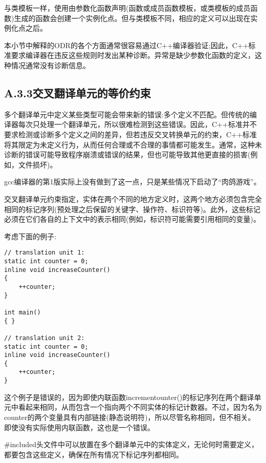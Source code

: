 与类模板一样，使用由参数化函数声明(函数或成员函数模板，或类模板的成员函数)生成的函数会创建一个实例化点。但与类模板不同，相应的定义可以出现在实例化点之后。

本小节中解释的ODR的各个方面通常很容易通过C++编译器验证;因此，C++标准要求编译器在违反这些规则时发出某种诊断。异常是缺少参数化函数的定义，这种情况通常没有诊断信息。

\subsection{A.3.3\hspace{0.2cm}交叉翻译单元的等价约束}

多个翻译单元中定义某些类型可能会带来新的错误:多个定义不匹配。但传统的编译器每次只处理一个翻译单元，所以很难检测到这些错误。因此，C++标准并不要求检测或诊断多个定义之间的差异，但若违反交叉转换单元的约束，C++标准将其限定为未定义行为，从而任何合理或不合理的事情都可能发生。通常，这种未诊断的错误可能导致程序崩溃或错误的结果，但也可能导致其他更直接的损害(例如，文件损坏)。

\begin{tcolorbox}[colback=webgreen!5!white,colframe=webgreen!75!black]
\hspace*{0.75cm}gcc编译器的第1版实际上没有做到了这一点，只是某些情况下启动了“肉鸽游戏”。
\end{tcolorbox}

交叉翻译单元约束指定，实体在两个不同的地方定义时，这两个地方必须包含完全相同的标记序列(预处理之后保留的关键字、操作符、标识符等)。此外，这些标记必须在它们各自的上下文中的表示相同(例如，标识符可能需要引用相同的变量)。

考虑下面的例子:

\begin{lstlisting}[style=styleCXX]
// translation unit 1:
static int counter = 0;
inline void increaseCounter()
{
	++counter;
}

int main()
{ }

// translation unit 2:
static int counter = 0;
inline void increaseCounter()
{
	++counter;
}
\end{lstlisting}

这个例子是错误的，因为即使内联函数incrementounter()的标记序列在两个翻译单元中看起来相同，从而包含一个指向两个不同实体的标记计数器。不过，因为名为counter的两个变量具有内部链接(静态说明符)，所以尽管名称相同，但不相关。即使没有实际使用内联函数，这也是一个错误。

\#included头文件中可以放置在多个翻译单元中的实体定义，无论何时需要定义，都要包含这些定义，确保在所有情况下标记序列都相同。

